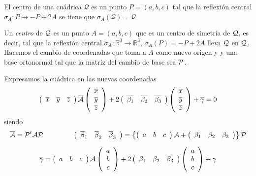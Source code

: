 \begin{nprop}
	El centro de una cuádrica $\mathcal Q$ es un punto $P=(a,b,c)$ tal que la reflexión central $\sigma_A: P \mapsto -P+2A$ se tiene que $\sigma_A (\mathcal Q) = \mathcal Q$
\end{nprop}


\begin{ndef}[Centro]
	Un {\it centro} de $\cal Q$ es un punto $A=(a,b,c)$ que es un centro de simetr\'ia de $\cal Q$, es decir, tal que la reflexi\'on central $\sigma_A:\mathbb{R}^3\longrightarrow\mathbb{R}^3$, $\sigma_A(P)= -P+2A$ lleva  $\cal Q$ en $\cal Q$. Hacemos el cambio de coordenadas que toma a $A$ como nuevo origen y
y una base ortonormal tal que la matriz del cambio de base sea $\cal P$.
\end{ndef}


Expresamos la cu\'adrica en las nuevas coordenadas
\[
\left( \begin{array}{ccc}
\overline{x} & \overline{y} & \overline{z}
 \end{array} \right)\overline{{\cal A}}
\left(\begin{array}{c}
\overline{x} \\
\overline{y} \\
\overline{z}
\end{array} \right)
+
2
 \left( \begin{array}{ccc}
\overline{\beta_1} & \overline{\beta_2} & \overline{\beta_3}
 \end{array} \right)
\left( \begin{array}{c}
\overline{x} \\
\overline{y} \\
\overline{z}
 \end{array} \right)
+ \overline{\gamma} = 0
\]
siendo
\[
\overline{{\cal A}} = {\cal P}^t{\cal A}{\cal P} \hspace{1.5cm}
\left( \begin{array}{ccc}
\overline{\beta}_1 & \overline{\beta}_2 & \overline{\beta}_3
 \end{array} \right) =
  \left\{
\left( \begin{array}{ccc}
a &  b &  c
 \end{array} \right){\cal A} +
 \left( \begin{array}{ccc}
\beta_1 & \beta_2 & \beta_3
 \end{array} \right) \right\}
{\cal P}
\]


\[
 \overline{\gamma} = \left( \begin{array}{ccc}
a &  b & c
 \end{array} \right){\cal A}
\left(\begin{array}{c}
a  \\
b \\
c
\end{array} \right)  +
2 \left( \begin{array}{ccc}
\beta_1 & \beta_2 & \beta_3
 \end{array} \right)
\left( \begin{array}{c}
a \\
b \\
c
 \end{array} \right)
+ \gamma
\]

